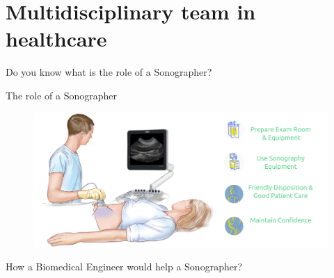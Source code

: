 \section{Multidisciplinary team in healthcare}

{
\begin{frame}{}

\BigSizeFont
\begin{center}
    Do you know what is the role of a Sonographer?
\end{center}

\end{frame}
}


{
    \begin{frame}{The role of a Sonographer}
      \begin{figure}
        \centering
        \includegraphics[width=1.0\textwidth]{./../figures/sonographer/versions/drawing-v02.png}
      \end{figure}
\end{frame}
}



{
\begin{frame}{}

\BigSizeFont
\begin{center}
    How a Biomedical Engineer would help a Sonographer?
\end{center}

\end{frame}
}
